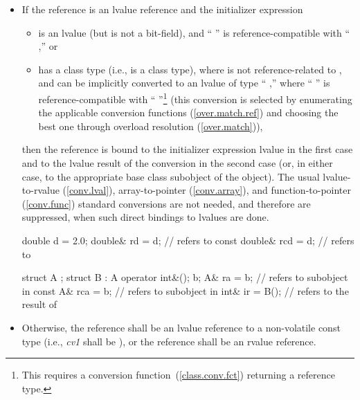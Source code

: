 \begin{itemize}
\item
If the reference is an lvalue reference and the initializer expression

\begin{itemize}
\item
is an lvalue (but is not a
bit-field), and
`` '' is reference-compatible with
`` ,'' or
\item
has a class type (i.e.,
is a class type), where  is not reference-related to , and can be implicitly converted
to an lvalue of type `` ,'' where
`` '' is reference-compatible with
`` ''\footnote{This requires a conversion
function~(\ref{class.conv.fct}) returning a reference type.}
(this conversion is selected by enumerating the applicable conversion
functions (\ref{over.match.ref}) and choosing the best one through overload
resolution (\ref{over.match})),
\end{itemize}
then the reference is bound to the initializer expression lvalue in the
first case and to the lvalue result of the conversion
in the second case (or, in either case, to the appropriate base class subobject of the object).
\enternote
The usual lvalue-to-rvalue (\ref{conv.lval}), array-to-pointer
(\ref{conv.array}), and function-to-pointer (\ref{conv.func}) standard
conversions are not needed, and therefore are suppressed, when such
direct bindings to lvalues are done.
\exitnote

\enterexample

\begin{codeblock}
double d = 2.0;
double& rd = d;                 //  refers to 
const double& rcd = d;          //  refers to 

struct A { };
struct B : A { operator int&(); } b;
A& ra = b;                      //  refers to  subobject in 
const A& rca = b;               //  refers to  subobject in 
int& ir = B();                  //  refers to the result of 
\end{codeblock}
\exitexample

\item
Otherwise, the reference shall be an lvalue reference to a non-volatile
const type (i.e.,
\textit{cv1}
shall be
), or the reference shall be an rvalue reference.
\enterexample


\end{itemize}

